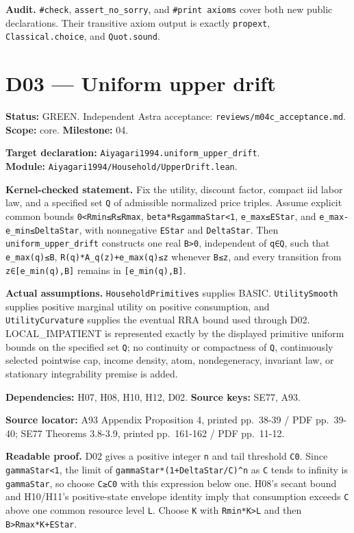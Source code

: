 \documentclass[
  11pt,
]{article}
\let\LedgerOriginalTexttt\texttt
\renewcommand{\texttt}[1]{{\small\LedgerOriginalTexttt{#1}}}
\begin{document}
\textbf{Audit.} \texttt{\#check}, \texttt{assert\_no\_sorry}, and
\texttt{\#print\ axioms} cover both new public declarations. Their
transitive axiom output is exactly \texttt{propext},
\texttt{Classical.choice}, and \texttt{Quot.sound}.

\section{D03 --- Uniform upper drift}\label{d03-uniform-upper-drift}

\textbf{Status:} GREEN. Independent Astra acceptance:
\texttt{reviews/m04c\_acceptance.md}. \textbf{Scope:} core.
\textbf{Milestone:} 04.

\textbf{Target declaration:}
\texttt{Aiyagari1994.uniform\_upper\_drift}.\\
\textbf{Module:} \texttt{Aiyagari1994/Household/UpperDrift.lean}.

\textbf{Kernel-checked statement.} Fix the utility, discount factor,
compact iid labor law, and a specified set \texttt{Q} of admissible
normalized price triples. Assume explicit common bounds
\texttt{0\textless{}Rmin≤R≤Rmax}, \texttt{beta*R≤gammaStar\textless{}1},
\texttt{e\_max≤EStar}, and \texttt{e\_max-e\_min≤DeltaStar}, with
nonnegative \texttt{EStar} and \texttt{DeltaStar}. Then
\texttt{uniform\_upper\_drift} constructs one real
\texttt{B\textgreater{}0}, independent of \texttt{q∈Q}, such that
\texttt{e\_max(q)≤B}, \texttt{R(q)*A\_q(z)+e\_max(q)≤z} whenever
\texttt{B≤z}, and every transition from \texttt{z∈{[}e\_min(q),B{]}}
remains in \texttt{{[}e\_min(q),B{]}}.

\textbf{Actual assumptions.} \texttt{HouseholdPrimitives} supplies
BASIC. \texttt{UtilitySmooth} supplies positive marginal utility on
positive consumption, and \texttt{UtilityCurvature} supplies the
eventual RRA bound used through D02. LOCAL\_IMPATIENT is represented
exactly by the displayed primitive uniform bounds on the specified set
\texttt{Q}; no continuity or compactness of \texttt{Q}, continuously
selected pointwise cap, income density, atom, nondegeneracy, invariant
law, or stationary integrability premise is added.

\textbf{Dependencies:} H07, H08, H10, H12, D02. \textbf{Source keys:}
SE77, A93.

\textbf{Source locator:} A93 Appendix Proposition 4, printed pp.~38-39 /
PDF pp.~39-40; SE77 Theorems 3.8-3.9, printed pp.~161-162 / PDF
pp.~11-12.

\textbf{Readable proof.} D02 gives a positive integer \texttt{n} and
tail threshold \texttt{C0}. Since \texttt{gammaStar\textless{}1}, the
limit of \texttt{gammaStar*(1+DeltaStar/C)\^{}n} as \texttt{C} tends to
infinity is \texttt{gammaStar}, so choose \texttt{C≥C0} with this
expression below one. H08's secant bound and H10/H11's positive-state
envelope identity imply that consumption exceeds \texttt{C} above one
common resource level \texttt{L}. Choose \texttt{K} with
\texttt{Rmin*K\textgreater{}L} and then
\texttt{B\textgreater{}Rmax*K+EStar}.
\end{document}
